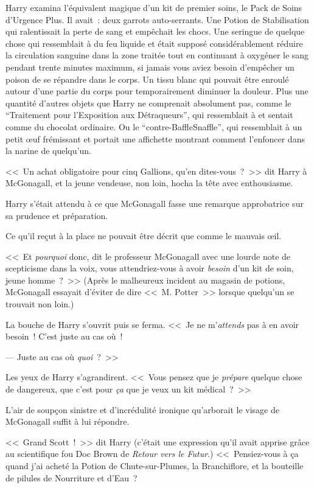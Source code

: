 Harry examina l'équivalent magique d'un kit de premier soins, le Pack de Soins d'Urgence Plus. Il avait~: deux garrots auto-serrants. Une Potion de Stabilisation qui ralentissait la perte de sang et empêchait les chocs. Une seringue de quelque chose qui ressemblait à du feu liquide et était supposé considérablement réduire la circulation sanguine dans la zone traitée tout en continuant à oxygéner le sang pendant trente minutes maximum, si jamais vous aviez besoin d'empêcher un poison de se répandre dans le corps. Un tissu blanc qui pouvait être enroulé autour d'une partie du corps pour temporairement diminuer la douleur. Plus une quantité d'autres objets que Harry ne comprenait absolument pas, comme le “Traitement pour l'Exposition aux Détraqueurs”, qui ressemblait à et sentait comme du chocolat ordinaire. Ou le “contre-BaffleSnaffle”, qui ressemblait à un petit œuf frémissant et portait une affichette montrant comment l'enfoncer dans la narine de quelqu'un.

<<~Un achat obligatoire pour cinq Gallions, qu'en dites-vous~?~>> dit Harry à McGonagall, et la jeune vendeuse, non loin, hocha la tête avec enthousiasme.

Harry s'était attendu à ce que McGonagall fasse une remarque approbatrice sur sa prudence et préparation.

Ce qu'il reçut à la place ne pouvait être décrit que comme le mauvais œil.

<<~Et \emph{pourquoi} donc, dit le professeur McGonagall avec une lourde note de scepticisme dans la voix, vous attendriez-vous à avoir \emph{besoin} d'un kit de soin, jeune homme~?~>> (Après le malheureux incident au magasin de potions, McGonagall essayait d'éviter de dire <<~M. Potter~>> lorsque quelqu'un se trouvait non loin.)

La bouche de Harry s'ouvrit puis se ferma.
<<~Je ne m'\emph{attends} pas à en avoir besoin~! C'est juste au cas où~!

--- Juste au cas où \emph{quoi}~?~>>

Les yeux de Harry s'agrandirent. <<~Vous pensez que je \emph{prépare} quelque chose de dangereux, que c'est pour \emph{ça} que je veux un kit médical~?~>>

L'air de soupçon sinistre et d'incrédulité ironique qu'arborait le visage de McGonagall suffit à lui répondre.

<<~Grand Scott~!~>> dit Harry (c'était une expression qu'il avait apprise grâce au scientifique fou Doc Brown de \emph{Retour vers le Futur}.) <<~Pensiez-vous à ça quand j'ai acheté la Potion de Chute-sur-Plumes, la Branchiflore, et la bouteille de pilules de Nourriture et d'Eau~?

